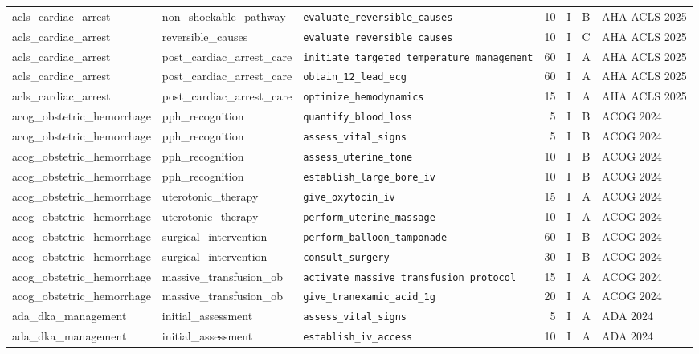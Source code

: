 \begin{longtable}{lllrrll}
acls\_cardiac\_arrest & non\_shockable\_pathway & \texttt{evaluate\_reversible\_causes} & 10 & I & B & AHA ACLS 2025 \\
acls\_cardiac\_arrest & reversible\_causes & \texttt{evaluate\_reversible\_causes} & 10 & I & C & AHA ACLS 2025 \\
acls\_cardiac\_arrest & post\_cardiac\_arrest\_care & \texttt{initiate\_targeted\_temperature\_management} & 60 & I & A & AHA ACLS 2025 \\
acls\_cardiac\_arrest & post\_cardiac\_arrest\_care & \texttt{obtain\_12\_lead\_ecg} & 60 & I & A & AHA ACLS 2025 \\
acls\_cardiac\_arrest & post\_cardiac\_arrest\_care & \texttt{optimize\_hemodynamics} & 15 & I & A & AHA ACLS 2025 \\
acog\_obstetric\_hemorrhage & pph\_recognition & \texttt{quantify\_blood\_loss} & 5 & I & B & ACOG 2024 \\
acog\_obstetric\_hemorrhage & pph\_recognition & \texttt{assess\_vital\_signs} & 5 & I & B & ACOG 2024 \\
acog\_obstetric\_hemorrhage & pph\_recognition & \texttt{assess\_uterine\_tone} & 10 & I & B & ACOG 2024 \\
acog\_obstetric\_hemorrhage & pph\_recognition & \texttt{establish\_large\_bore\_iv} & 10 & I & B & ACOG 2024 \\
acog\_obstetric\_hemorrhage & uterotonic\_therapy & \texttt{give\_oxytocin\_iv} & 15 & I & A & ACOG 2024 \\
acog\_obstetric\_hemorrhage & uterotonic\_therapy & \texttt{perform\_uterine\_massage} & 10 & I & A & ACOG 2024 \\
acog\_obstetric\_hemorrhage & surgical\_intervention & \texttt{perform\_balloon\_tamponade} & 60 & I & B & ACOG 2024 \\
acog\_obstetric\_hemorrhage & surgical\_intervention & \texttt{consult\_surgery} & 30 & I & B & ACOG 2024 \\
acog\_obstetric\_hemorrhage & massive\_transfusion\_ob & \texttt{activate\_massive\_transfusion\_protocol} & 15 & I & A & ACOG 2024 \\
acog\_obstetric\_hemorrhage & massive\_transfusion\_ob & \texttt{give\_tranexamic\_acid\_1g} & 20 & I & A & ACOG 2024 \\
ada\_dka\_management & initial\_assessment & \texttt{assess\_vital\_signs} & 5 & I & A & ADA 2024 \\
ada\_dka\_management & initial\_assessment & \texttt{establish\_iv\_access} & 10 & I & A & ADA 2024 \\

\end{longtable}
